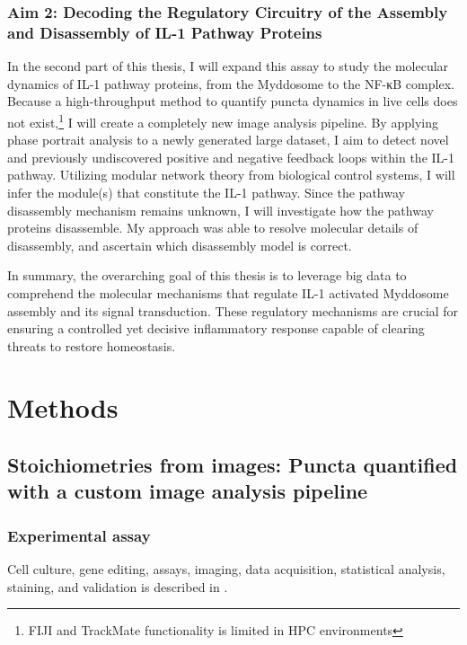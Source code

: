 \section{Aim 2: Decoding the Regulatory Circuitry of the Assembly and Disassembly of IL-1 Pathway Proteins}
In the second part of this thesis, I will expand this assay to study the molecular dynamics of IL-1 pathway proteins, from the Myddosome to the NF-κB complex. Because a high-throughput method to quantify puncta dynamics in live cells does not exist,\footnote{FIJI \autocite{Schindelin_2012} and TrackMate \autocite{Tinevez_2017} functionality is limited in HPC environments} I will create a completely new image analysis pipeline. By applying phase portrait analysis to a newly generated large dataset, I aim to detect novel and previously undiscovered positive and negative feedback loops within the IL-1 pathway. Utilizing modular network theory from biological control systems, I will infer the module(s) that constitute the IL-1 pathway. Since the pathway disassembly mechanism remains unknown, I will investigate how the pathway proteins disassemble. My approach was able to resolve molecular details of disassembly, and ascertain which disassembly model is correct.
 
In summary, the overarching goal of this thesis is to leverage big data to comprehend the molecular mechanisms that regulate IL-1 activated Myddosome assembly and its signal transduction. These regulatory mechanisms are crucial for ensuring a controlled yet decisive inflammatory response capable of clearing threats to restore homeostasis.

\mygeometry
\part{Methods}
\restoregeometry
\chapter{Stoichiometries from images: Puncta quantified with a custom image analysis pipeline}
\label{chapter:pipeline_v1}
\section{Experimental assay}
\label{section:assay_v1}
Cell culture, gene editing, assays, imaging, data acquisition, statistical analysis, staining, and validation is described in \autocite{Cao_2023}\autocite{Deliz-Aguirre_2021}. 

